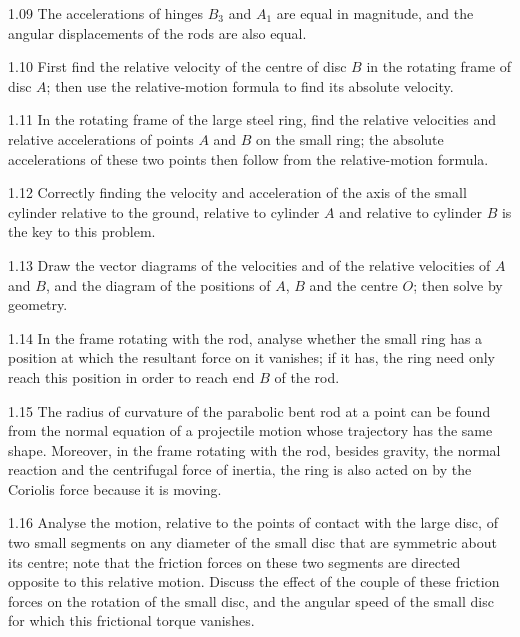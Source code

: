 \begin{hint}{1.09}
The accelerations of hinges $B_3$ and $A_1$ are equal in magnitude, and the angular displacements of the rods are also equal.
\end{hint}

\begin{hint}{1.10}
First find the relative velocity of the centre of disc $B$ in the rotating frame of disc $A$; then use the relative-motion formula to find its absolute velocity.
\end{hint}

\begin{hint}{1.11}
In the rotating frame of the large steel ring, find the relative velocities and relative accelerations of points $A$ and $B$ on the small ring; the absolute accelerations of these two points then follow from the relative-motion formula.
\end{hint}

\begin{hint}{1.12}
Correctly finding the velocity and acceleration of the axis of the small cylinder relative to the ground, relative to cylinder $A$ and relative to cylinder $B$ is the key to this problem.
\end{hint}

\begin{hint}{1.13}
Draw the vector diagrams of the velocities and of the relative velocities of $A$ and $B$, and the diagram of the positions of $A$, $B$ and the centre $O$; then solve by geometry.
\end{hint}

\begin{hint}{1.14}
In the frame rotating with the rod, analyse whether the small ring has a position at which the resultant force on it vanishes; if it has, the ring need only reach this position in order to reach end $B$ of the rod.
\end{hint}

\begin{hint}{1.15}
The radius of curvature of the parabolic bent rod at a point can be found from the normal equation of a projectile motion whose trajectory has the same shape. Moreover, in the frame rotating with the rod, besides gravity, the normal reaction and the centrifugal force of inertia, the ring is also acted on by the Coriolis force because it is moving.
\end{hint}

\begin{hint}{1.16}
Analyse the motion, relative to the points of contact with the large disc, of two small segments on any diameter of the small disc that are symmetric about its centre; note that the friction forces on these two segments are directed opposite to this relative motion. Discuss the effect of the couple of these friction forces on the rotation of the small disc, and the angular speed of the small disc for which this frictional torque vanishes.
\end{hint}

